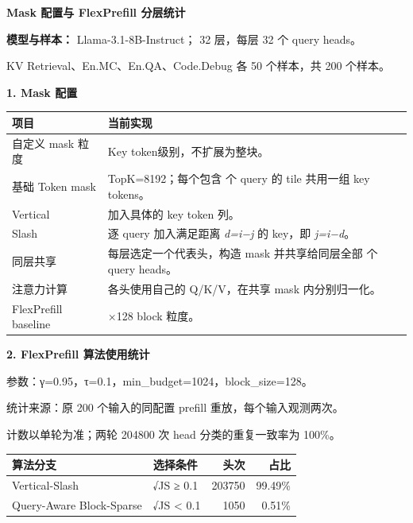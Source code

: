 \documentclass[11pt,a4paper]{article}
\newcommand{\zh}[1]{{\CJKfont #1}}
\newcommand{\en}[1]{{\rmfamily #1}}
\begin{document}
\begin{center}
  {\Large\bfseries Mask \zh{配置与} FlexPrefill \zh{分层统计}}
\end{center}

{\bfseries\zh{模型与样本：}} Llama-3.1-8B-Instruct\zh{；}
32 \zh{层，每层} 32 \zh{个} query heads\zh{。}\par
KV Retrieval\zh{、}En.MC\zh{、}En.QA\zh{、}Code.Debug
\zh{各} 50 \zh{个样本，共} 200 \zh{个样本。}

\vspace{3pt}
{\large\bfseries 1. Mask \zh{配置}}

\begin{tabularx}{\textwidth}{@{}p{32mm}X@{}}
\toprule
\textbf{\zh{项目}} & \textbf{\zh{当前实现}} \\
\midrule
\zh{自定义} mask \zh{粒度} & Key token\zh{级别，不扩展为整块。} \\
\zh{基础} Token mask & \en{TopK=8192}\zh{；每个包含} \en{128} \zh{个} \en{query} \zh{的} \en{tile} \zh{共用一组} \en{key tokens}\zh{。} \\
Vertical & \zh{加入具体的} \en{key token} \zh{列。} \\
Slash & \zh{逐} \en{query} \zh{加入满足距离} \en{\textit{d=i−j}} \zh{的} \en{key}\zh{，即} \en{\textit{j=i−d}}\zh{。} \\
\zh{同层共享} & \zh{每层选定一个代表头，构造} \en{mask} \zh{并共享给同层全部} \en{32} \zh{个} \en{query heads}\zh{。} \\
\zh{注意力计算} & \zh{各头使用自己的} \en{Q/K/V}\zh{，在共享} \en{mask} \zh{内分别归一化。} \\
FlexPrefill baseline & \en{128×128 block} \zh{粒度。} \\
\bottomrule
\end{tabularx}

\vspace{8pt}
{\large\bfseries 2. FlexPrefill \zh{算法使用统计}}

\zh{参数：}γ=0.95\zh{，}τ=0.1\zh{，}min\_budget=1024\zh{，}block\_size=128\zh{。}

\zh{统计来源：原} 200 \zh{个输入的同配置} prefill \zh{重放，每个输入观测两次。}
\par\zh{计数以单轮为准；两轮} 204800 \zh{次} head \zh{分类的重复一致率为} 100\%\zh{。}

\begin{tabularx}{\textwidth}{@{}lXrr@{}}
\toprule
\textbf{\zh{算法分支}} & \textbf{\zh{选择条件}} & \textbf{\zh{头次}} & \textbf{\zh{占比}} \\
\midrule
Vertical-Slash & √JS ≥ 0.1 & 203750 & 99.49\% \\
Query-Aware Block-Sparse & √JS < 0.1 & 1050 & 0.51\% \\
\bottomrule
\end{tabularx}
\end{document}

